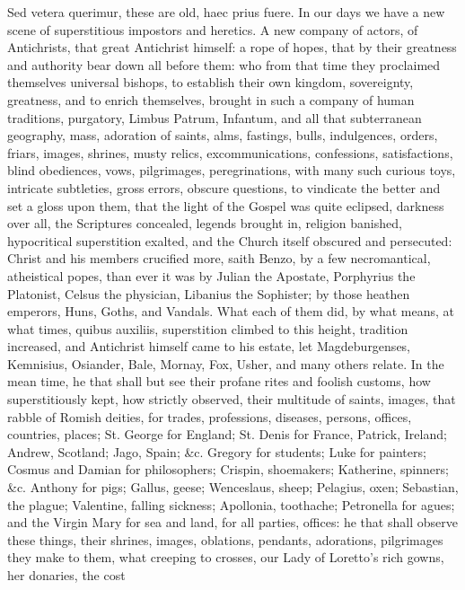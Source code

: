 {Sed vetera querimur, these are old, haec prius fuere. In our days we
have a new scene of superstitious impostors and heretics. A new company
of actors, of Antichrists, that great Antichrist himself: a rope of
hopes, that by their greatness and authority bear down all before them:
who from that time they proclaimed themselves universal bishops, to
establish their own kingdom, sovereignty, greatness, and to enrich
themselves, brought in such a company of human traditions, purgatory,
Limbus Patrum, Infantum, and all that subterranean geography, mass,
adoration of saints, alms, fastings, bulls, indulgences, orders,
friars, images, shrines, musty relics, excommunications, confessions,
satisfactions, blind obediences, vows, pilgrimages, peregrinations,
with many such curious toys, intricate subtleties, gross errors,
obscure questions, to vindicate the better and set a gloss upon them,
that the light of the Gospel was quite eclipsed, darkness over all, the
Scriptures concealed, legends brought in, religion banished,
hypocritical superstition exalted, and the Church itself 
obscured and persecuted: Christ and his members crucified more, saith
Benzo, by a few necromantical, atheistical popes, than ever it was by
 Julian the Apostate, Porphyrius the Platonist, Celsus the
physician, Libanius the Sophister; by those heathen emperors, Huns,
Goths, and Vandals. What each of them did, by what means, at what
times, quibus auxiliis, superstition climbed to this height, tradition
increased, and Antichrist himself came to his estate, let
Magdeburgenses, Kemnisius, Osiander, Bale, Mornay, Fox, Usher, and many
others relate. In the mean time, he that shall but see their profane
rites and foolish customs, how superstitiously kept, how strictly
observed, their multitude of saints, images, that rabble of Romish
deities, for trades, professions, diseases, persons, offices,
countries, places; St. George for England; St. Denis for France,
Patrick, Ireland; Andrew, Scotland; Jago, Spain; \&c. Gregory for
students; Luke for painters; Cosmus and Damian for philosophers;
Crispin, shoemakers; Katherine, spinners; \&c. Anthony for pigs; Gallus,
geese; Wenceslaus, sheep; Pelagius, oxen; Sebastian, the plague;
Valentine, falling sickness; Apollonia, toothache; Petronella for
agues; and the Virgin Mary for sea and land, for all parties, offices:
he that shall observe these things, their shrines, images, oblations,
pendants, adorations, pilgrimages they make to them, what creeping to
crosses, our Lady of Loretto's rich gowns, her donaries, the cost
}
